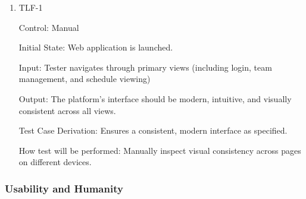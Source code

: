 \documentclass[12pt, titlepage]{article}
\begin{document}
\begin{enumerate}

  \item{TLF-1\\}

        Control: Manual

        Initial State: Web application is launched.

        Input: Tester navigates through primary views (including login, team management, and schedule viewing)

        Output: The platform’s interface should be modern, intuitive, and visually consistent across all views.

        Test Case Derivation: Ensures a consistent, modern interface as specified.

        How test will be performed: Manually inspect visual consistency across pages on different devices.

\end{enumerate}

\subsubsection{Usability and Humanity}
\end{document}
